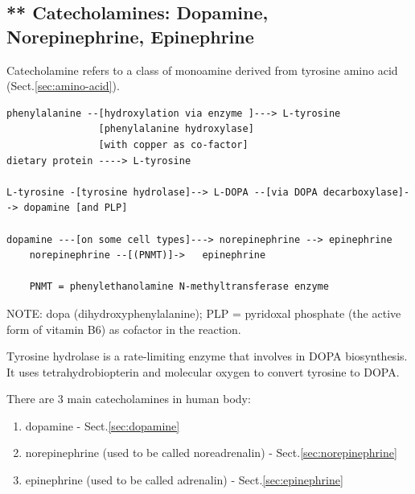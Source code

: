 \subsection{** Catecholamines: Dopamine, Norepinephrine, Epinephrine}
\label{sec:Catecholamines}


Catecholamine refers to a class of monoamine derived from tyrosine amino acid
(Sect.\ref{sec:amino-acid}).

\begin{verbatim}
phenylalanine --[hydroxylation via enzyme ]---> L-tyrosine
                [phenylalanine hydroxylase]
                [with copper as co-factor]
dietary protein ----> L-tyrosine           

L-tyrosine -[tyrosine hydrolase]--> L-DOPA --[via DOPA decarboxylase]--> dopamine [and PLP]

dopamine ---[on some cell types]---> norepinephrine --> epinephrine
    norepinephrine --[(PNMT)]->   epinephrine
    
    PNMT = phenylethanolamine N-methyltransferase enzyme 
\end{verbatim}
NOTE: dopa (dihydroxyphenylalanine); PLP = pyridoxal phosphate (the active form
of vitamin B6) as cofactor in the reaction.

Tyrosine hydrolase is a rate-limiting enzyme that involves in DOPA biosynthesis.
It uses tetrahydrobiopterin and molecular oxygen to convert tyrosine to
DOPA.

There are 3 main catecholamines in human body: 
\begin{enumerate}
  \item dopamine - Sect.\ref{sec:dopamine} 
  
  \item norepinephrine (used to be called noreadrenalin) - Sect.\ref{sec:norepinephrine}

  \item epinephrine (used to  be called adrenalin) - Sect.\ref{sec:epinephrine}
\end{enumerate}

